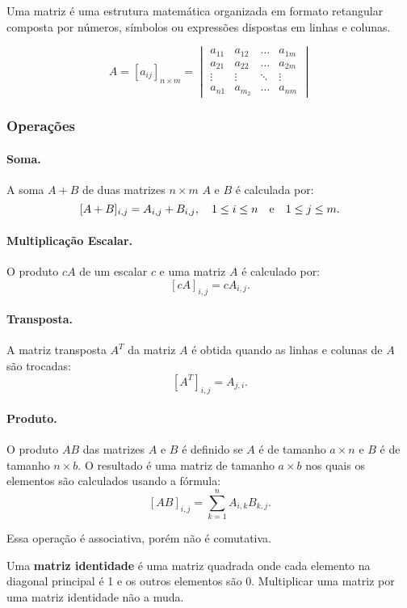 Uma matriz é uma estrutura matemática organizada em formato retangular composta por números, símbolos ou expressões dispostas em linhas e colunas.

$$
A = [a_{ij}]_{n\times m} = 
\begin{vmatrix}
	a_{11} &a_{12}& \dots& a_{1m} \\
	a_{21} &a_{22} &\dots &a_{2m} \\
	\vdots &\vdots &\ddots &\vdots \\
	a_{n1} &a_{m_2} &\dots &a_{nm}
\end{vmatrix}
$$

\subsubsection*{Operações}
\paragraph{Soma.} A soma $A+B$ de duas matrizes $n\times m$ $A$ e $B$ é calculada por:
$$[A+B]_{i,j} = A_{i,j} + B_{i,j}, \quad 1 \leq i \leq n \quad \textnormal{e} \quad 1 \leq j \leq m.$$

\paragraph{Multiplicação Escalar.} O produto $cA$ de um escalar $c$ e uma matriz $A$ é calculado por:
$$[cA]_{i,j} = cA_{i,j}.$$

\paragraph{Transposta.} A matriz transposta $A^T$ da matriz $A$ é obtida quando as linhas e colunas de $A$ são trocadas:
$$[A^T]_{i,j} = A_{j,i}.$$

\paragraph{Produto.} O produto $AB$ das matrizes $A$ e $B$ é definido se $A$ é de tamanho $a\times n$ e $B$ é de tamanho $n\times b$. O resultado é uma matriz de tamanho $a\times b$ nos quais os elementos são calculados usando a fórmula:
$$[AB]_{i,j} = \sum_{k = 1}^{n} A_{i,k}B_{k,j}.$$

Essa operação é associativa, porém não é comutativa.

Uma \textbf{matriz identidade} é uma matriz quadrada onde cada elemento na diagonal principal é 1 e os outros elementos são 0. Multiplicar uma matriz por uma matriz identidade não a muda.

